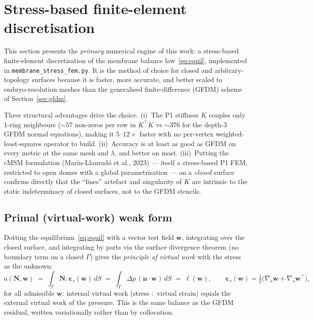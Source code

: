 \documentclass[11pt]{article}
\newcommand{\vv}[1]{\bm{#1}}          %
\newcommand{\nn}{\vv{n}}               %
\newcommand{\NN}{\vv{N}}               %
\begin{document}
\section{Stress-based finite-element discretisation}
\label{sec:fem}

This section presents the \emph{primary} numerical engine of this work: a
stress-based finite-element discretisation of the membrane balance
law~\eqref{eq:equil}, implemented in \texttt{membrane\_stress\_fem.py}.  It is
the method of choice for closed and arbitrary-topology surfaces because it is
faster, more accurate, and better scaled to embryo-resolution meshes than the
generalised finite-difference (GFDM) scheme of Section~\ref{sec:gfdm}.

Three structural advantages drive the choice.  (i)~The P1 stiffness $K$ couples
only 1-ring neighbours (${\sim}57$ non-zeros per row in $K^\top K$ vs
${\sim}376$ for the depth-3 GFDM normal equations), making it $5$--$12\times$
faster with no per-vertex weighted-least-squares operator to build.
(ii)~Accuracy is at least as good as GFDM on every metric at the same mesh and
$\lambda$, and better on most.
(iii)~Putting the cMSM formulation (Mar\'in-Llaurad\'o et al., 2023) --- itself
a stress-based P1 FEM, restricted to open domes with a global parametrisation
--- on a \emph{closed} surface confirms directly that the ``lines'' artefact and
singularity of $K$ are intrinsic to the static indeterminacy of closed surfaces,
not to the GFDM stencils.

\subsection{Primal (virtual-work) weak form}
\label{sec:fem-weak}

Dotting the equilibrium~\eqref{eq:equil} with a vector test field $\vv w$,
integrating over the closed surface, and integrating by parts via the surface
divergence theorem (no boundary term on a closed $\Gamma$) gives the
\emph{principle of virtual work} with the stress as the unknown:
\begin{equation}
  a(\NN,\vv w)\;=\;\int_\Gamma \NN : \bm\varepsilon_s(\vv w)\,dS
  \;=\;\int_\Gamma \Delta p\,(\nn\cdot\vv w)\,dS\;=\;\ell(\vv w),
  \qquad
  \bm\varepsilon_s(\vv w)=\tfrac12\bigl(\nabla_{\!s}\vv w+\nabla_{\!s}\vv w^{\!\top}\bigr),
  \label{eq:fem-weak}
\end{equation}
for all admissible $\vv w$: internal virtual work (stress $:$ virtual strain)
equals the external virtual work of the pressure.  This is the same balance as
the GFDM residual, written variationally rather than by collocation.
\end{document}
